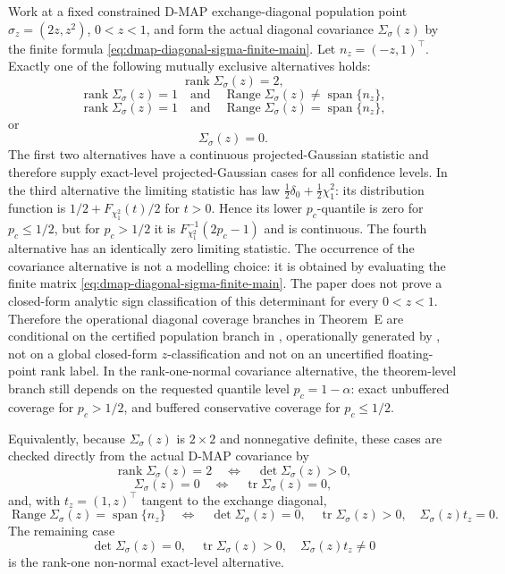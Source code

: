 \begin{lemma}\label{lem:dmap-diagonal-covariance-alternatives-main}
Work at a fixed constrained D-MAP exchange-diagonal population point
\(\sigma_z=(2z,z^2)\), \(0<z<1\), and form the actual diagonal covariance
\(\Sigma_\sigma(z)\) by the finite formula
\eqref{eq:dmap-diagonal-sigma-finite-main}.  Let \(n_z=(-z,1)^\top\).  Exactly
one of the following mutually exclusive
alternatives holds:
\[
\operatorname{rank}\Sigma_\sigma(z)=2,
\]
\[
\operatorname{rank}\Sigma_\sigma(z)=1
\quad\text{and}\quad
\operatorname{Range}\Sigma_\sigma(z)\ne\operatorname{span}\{n_z\},
\]
\[
\operatorname{rank}\Sigma_\sigma(z)=1
\quad\text{and}\quad
\operatorname{Range}\Sigma_\sigma(z)=\operatorname{span}\{n_z\},
\]
or
\[
\Sigma_\sigma(z)=0 .
\]
The first two alternatives have a continuous projected-Gaussian statistic and
therefore supply exact-level projected-Gaussian cases for all confidence
levels.  In the third alternative the limiting statistic has law
\(\frac12\delta_0+\frac12\chi^2_1\): its distribution function is
\(1/2+F_{\chi^2_1}(t)/2\) for \(t>0\).  Hence its lower \(p_c\)-quantile is
zero for \(p_c\le1/2\), but for \(p_c>1/2\) it is
\(F_{\chi^2_1}^{-1}(2p_c-1)\) and is continuous.  The
fourth alternative has an identically zero limiting statistic.  The occurrence
of the covariance alternative is not a modelling choice: it is obtained by
evaluating the finite matrix
\eqref{eq:dmap-diagonal-sigma-finite-main}.  The paper does not prove a
closed-form analytic sign classification of this determinant for every
\(0<z<1\).  Therefore the operational diagonal coverage branches in
Theorem~E are conditional on the certified population branch in
, operationally generated by
, not on a global
closed-form \(z\)-classification and not on an uncertified floating-point rank
label.  In
the rank-one-normal covariance
alternative, the theorem-level branch still depends on the requested quantile
level \(p_c=1-\alpha\): exact unbuffered coverage for \(p_c>1/2\),
and buffered conservative coverage for \(p_c\le1/2\).

Equivalently, because \(\Sigma_\sigma(z)\) is \(2\times2\) and nonnegative
definite, these cases are checked directly from the actual D-MAP covariance by
\[
\operatorname{rank}\Sigma_\sigma(z)=2
\quad\Longleftrightarrow\quad
\det\Sigma_\sigma(z)>0,
\]
\[
\Sigma_\sigma(z)=0
\quad\Longleftrightarrow\quad
\operatorname{tr}\Sigma_\sigma(z)=0,
\]
and, with \(t_z=(1,z)^\top\) tangent to the exchange diagonal,
\[
\operatorname{Range}\Sigma_\sigma(z)=\operatorname{span}\{n_z\}
\quad\Longleftrightarrow\quad
\det\Sigma_\sigma(z)=0,\quad
\operatorname{tr}\Sigma_\sigma(z)>0,\quad
\Sigma_\sigma(z)t_z=0 .
\]
The remaining case
\[
\det\Sigma_\sigma(z)=0,\quad
\operatorname{tr}\Sigma_\sigma(z)>0,\quad
\Sigma_\sigma(z)t_z\ne0
\]
is the rank-one non-normal exact-level alternative.
\end{lemma}

